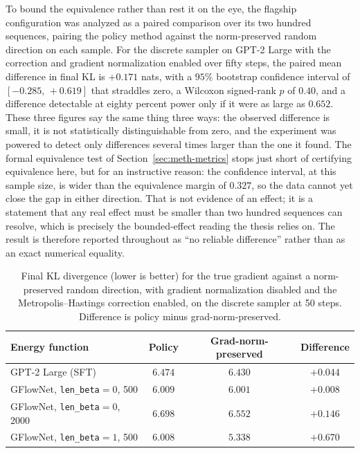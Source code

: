To bound the equivalence rather than rest it on the eye, the flagship configuration was analyzed as a paired comparison over its two hundred sequences, pairing the policy method against the norm-preserved random direction on each sample. For the discrete sampler on GPT-2 Large with the correction and gradient normalization enabled over fifty steps, the paired mean difference in final KL is $+0.171$ nats, with a $95\%$ bootstrap confidence interval of $[-0.285,\, +0.619]$ that straddles zero, a Wilcoxon signed-rank $p$ of $0.40$, and a difference detectable at eighty percent power only if it were as large as $0.652$.
These three figures say the same thing three ways: the observed difference is small, it is not statistically distinguishable from zero, and the experiment was powered to detect only differences several times larger than the one it found. The formal equivalence test of Section~\ref{sec:meth-metrics} stops just short of certifying equivalence here, but for an instructive reason: the confidence interval, at this sample size, is wider than the equivalence margin of $0.327$, so the data cannot yet close the gap in either direction. That is not evidence of an effect; it is a statement that any real effect must be smaller than two hundred sequences can resolve, which is precisely the bounded-effect reading the thesis relies on. The result is therefore reported throughout as ``no reliable difference'' rather than as an exact numerical equality.

\begin{table}[t]
    \centering
    \small
    \begin{tabular}{lccc}
        \toprule
        Energy function & Policy & Grad-norm-preserved & Difference \\
        \midrule
        GPT-2 Large (SFT) & $6.474$ & $6.430$ & $+0.044$ \\
        GFlowNet, \texttt{len\_beta}$=0$, 500 & $6.009$ & $6.001$ & $+0.008$ \\
        GFlowNet, \texttt{len\_beta}$=0$, 2000 & $6.698$ & $6.552$ & $+0.146$ \\
        GFlowNet, \texttt{len\_beta}$=1$, 500 & $6.008$ & $5.338$ & $+0.670$ \\
        \bottomrule
    \end{tabular}
    \caption[Final KL for the true gradient against a norm-preserved random direction.]{Final KL divergence (lower is better) for the true gradient against a norm-preserved random direction, with gradient normalization disabled and the Metropolis--Hastings correction enabled, on the discrete sampler at 50 steps. Difference is policy minus grad-norm-preserved.}
    \label{tab:fallacy}
\end{table}

